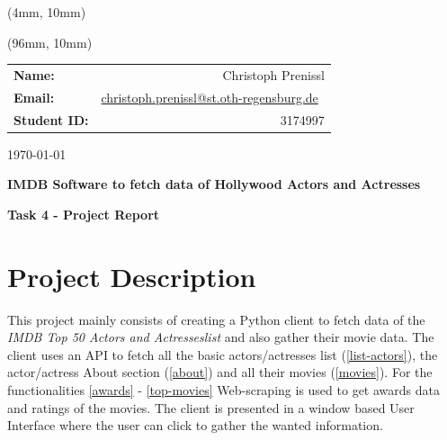 \documentclass[12pt]{article}
\author{Christoph Prenissl}
\date{\today}
\begin{document}
\begin{titlepage}

      \begin{textblock*}{200mm}(4mm, 10mm)
            \begin{figure}
                  \def\svgscale{0.6}
                  
            \end{figure}
      \end{textblock*}

      \begin{textblock*}{200mm}(96mm, 10mm)
            \begin{tabular}[h]{lr}
                  \textbf{Name:}       & Christoph Prenissl                                                                              \\
                  \textbf{Email:}      & \href{mailto:christoph.prenissl@st.oth-regensburg.de}{christoph.prenissl@st.oth-regensburg.de}\ \\
                  \textbf{Student ID:} & 3174997                                                                                         \\
            \end{tabular}
      \end{textblock*}

      \begin{flushright}
            \today
      \end{flushright}

      \vspace{2cm}

      \begin{center}
            \textbf{\Large{IMDB Software to fetch data of Hollywood Actors and Actresses}}

            \vspace{6cm}

            \textbf{Task 4 - Project Report}

            \vspace{10cm}
      \end{center}
\end{titlepage}

\newpage

\tableofcontents

\newpage

\section{Project Description}
This project mainly consists of creating a Python client to fetch data of the 
\textit{IMDB Top 50 Actors and Actresseslist} and also gather their movie data. 
The client uses an API to fetch all the basic actors/actresses list (\ref{list-actors}),
the actor/actress About section (\ref{about}) and all their movies (\ref{movies}).
For the functionalities \ref{awards} - \ref{top-movies} Web-scraping is used to 
get awards data and ratings of the movies.
The client is presented in a window based User Interface where the user 
can click to gather the wanted information.
\end{document}
